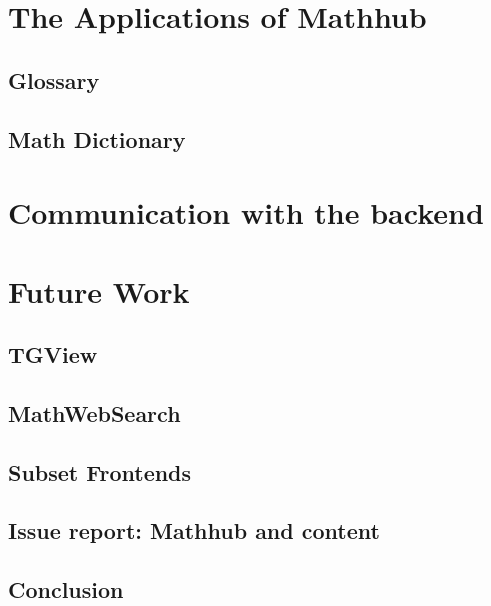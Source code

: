 \documentclass[11pt,a4paper]{article}
\begin{document}
\section{The Applications of Mathhub}
\subsection{Glossary}
\subsection{Math Dictionary}

\section{Communication with the backend}

\section{Future Work}
\subsection{TGView}
\subsection{MathWebSearch}
\subsection{Subset Frontends}
\subsection{Issue report: Mathhub and content}
\subsection{Conclusion}
\end{document}
